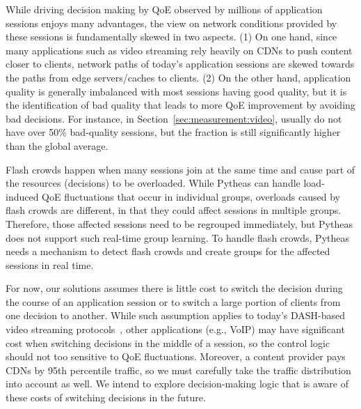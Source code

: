 While driving decision making by QoE observed by
millions of application sessions enjoys many advantages, 
the view on network conditions provided by these sessions
is fundamentally skewed in two aspects.
(1) On one hand, since many applications 
such as video streaming rely
heavily on CDNs to push content closer to clients, 
network paths of today's application sessions are skewed 
towards the paths from edge servers/caches to clients.
(2) On the other hand, application quality is generally 
imbalanced with most sessions having good quality, but it is 
the identification of bad quality that leads to more 
QoE improvement by avoiding bad decisions.
For instance, in Section~\ref{sec:measurement:video}, 
\problemclusters 
usually do not have over 50\% bad-quality sessions, 
but the fraction is still significantly higher than the 
global average.


Flash crowds happen when many sessions join at the same 
time and cause part of the resources (decisions) to be overloaded.
While Pytheas can handle load-induced QoE fluctuations that occur 
in individual groups, overloads caused by flash crowds are different, in 
that they could affect sessions in multiple groups. Therefore, those 
affected sessions need to be regrouped immediately, but Pytheas 
does not support such real-time group learning. 
To handle flash crowds, Pytheas needs a mechanism to detect flash 
crowds and create groups for the affected sessions in real time.



For now, our solutions assumes there is little cost to switch the decision
during the course of an application session or to
switch a large portion of clients from one decision to another. 
While such assumption applies to today's DASH-based video 
streaming protocols~\cite{dash-standard}, other applications (e.g., VoIP) 
may have significant cost when switching decisions in the middle of a 
session, so the control logic should not too sensitive to QoE fluctuations.
Moreover, a content provider pays CDNs by 95th percentile traffic, 
so we must carefully take the traffic distribution into account as well.
We intend to explore decision-making logic that is 
aware of these costs of switching decisions in the future.


